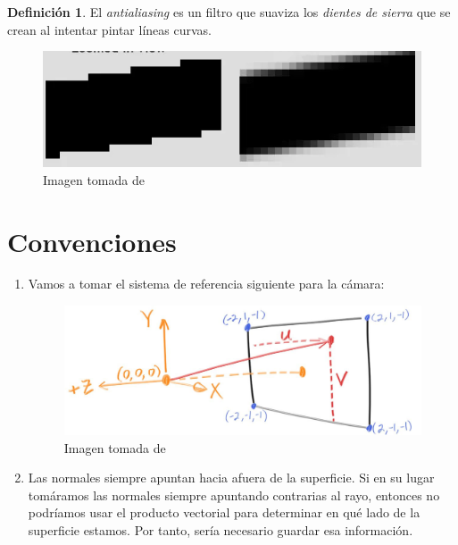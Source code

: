 \documentclass[12pt]{article}
\theoremstyle{definition}
\newtheorem{definition}[theorem]{Definición}
\theoremstyle{remark}
\begin{document}
\begin{definition}

El \textit{antialiasing} es un filtro que suaviza los \textit{dientes de sierra} que se crean al intentar pintar líneas curvas. 

\begin{figure}[H]
   \center
  \includegraphics[scale=0.6]{antialiasing.png}
  \caption{Imagen tomada de \cite{antialiasing}}
\end{figure}

\end{definition}

\section{Convenciones}

\begin{enumerate}

\item Vamos a tomar el sistema de referencia siguiente para la cámara:

\begin{figure}[H]
   \center
  \includegraphics[scale=0.3]{camera_convention.jpg}
  \caption{Imagen tomada de \cite{first_book}}
\end{figure}

\item Las normales siempre apuntan hacia afuera de la superficie. Si en su lugar tomáramos las normales siempre apuntando contrarias al rayo, entonces no podríamos usar el producto vectorial para determinar en qué lado de la superficie estamos. Por tanto, sería necesario guardar esa información.

\end{enumerate}
\end{document}
